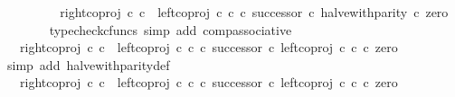 \begin{isabellebody}
\ \ \ \ \isamarkupfalse%
\ \isamarkupfalse%
\ {\isachardoublequoteopen}{\isachardot}{\kern0pt}{\isachardot}{\kern0pt}{\isachardot}{\kern0pt}\ {\isacharequal}{\kern0pt}\ right{\isacharunderscore}{\kern0pt}coproj\ {\isasymnat}\isactrlsub c\ {\isasymnat}\isactrlsub c\ {\isasymamalg}\ {\isacharparenleft}{\kern0pt}left{\isacharunderscore}{\kern0pt}coproj\ {\isasymnat}\isactrlsub c\ {\isasymnat}\isactrlsub c\ {\isasymcirc}\isactrlsub c\ successor{\isacharparenright}{\kern0pt}\ {\isasymcirc}\isactrlsub c\ halve{\isacharunderscore}{\kern0pt}with{\isacharunderscore}{\kern0pt}parity\ {\isasymcirc}\isactrlsub c\ zero{\isachardoublequoteclose}\isanewline
\ \ \ \ \ \ \isamarkupfalse%
\ {\isacharparenleft}{\kern0pt}typecheck{\isacharunderscore}{\kern0pt}cfuncs{\isacharcomma}{\kern0pt}\ simp\ add{\isacharcolon}{\kern0pt}\ comp{\isacharunderscore}{\kern0pt}associative{}{\isacharparenright}{\kern0pt}\isanewline
\ \ \ \ \isamarkupfalse%
\ \isamarkupfalse%
\ {\isachardoublequoteopen}{\isachardot}{\kern0pt}{\isachardot}{\kern0pt}{\isachardot}{\kern0pt}\ {\isacharequal}{\kern0pt}\ right{\isacharunderscore}{\kern0pt}coproj\ {\isasymnat}\isactrlsub c\ {\isasymnat}\isactrlsub c\ {\isasymamalg}\ {\isacharparenleft}{\kern0pt}left{\isacharunderscore}{\kern0pt}coproj\ {\isasymnat}\isactrlsub c\ {\isasymnat}\isactrlsub c\ {\isasymcirc}\isactrlsub c\ successor{\isacharparenright}{\kern0pt}\ {\isasymcirc}\isactrlsub c\ left{\isacharunderscore}{\kern0pt}coproj\ {\isasymnat}\isactrlsub c\ {\isasymnat}\isactrlsub c\ {\isasymcirc}\isactrlsub c\ zero{\isachardoublequoteclose}\isanewline
\ \ \ \ \ \ \isamarkupfalse%
\ {\isacharparenleft}{\kern0pt}simp\ add{\isacharcolon}{\kern0pt}\ halve{\isacharunderscore}{\kern0pt}with{\isacharunderscore}{\kern0pt}parity{\isacharunderscore}{\kern0pt}def{}{\isacharparenright}{\kern0pt}\isanewline
\ \ \ \ \isamarkupfalse%
\ \isamarkupfalse%
\ {\isachardoublequoteopen}{\isachardot}{\kern0pt}{\isachardot}{\kern0pt}{\isachardot}{\kern0pt}\ {\isacharequal}{\kern0pt}\ {\isacharparenleft}{\kern0pt}right{\isacharunderscore}{\kern0pt}coproj\ {\isasymnat}\isactrlsub c\ {\isasymnat}\isactrlsub c\ {\isasymamalg}\ {\isacharparenleft}{\kern0pt}left{\isacharunderscore}{\kern0pt}coproj\ {\isasymnat}\isactrlsub c\ {\isasymnat}\isactrlsub c\ {\isasymcirc}\isactrlsub c\ successor{\isacharparenright}{\kern0pt}\ {\isasymcirc}\isactrlsub c\ left{\isacharunderscore}{\kern0pt}coproj\ {\isasymnat}\isactrlsub c\ {\isasymnat}\isactrlsub c{\isacharparenright}{\kern0pt}\ {\isasymcirc}\isactrlsub c\ zero{\isachardoublequoteclose}\isanewline

\end{isabellebody}
